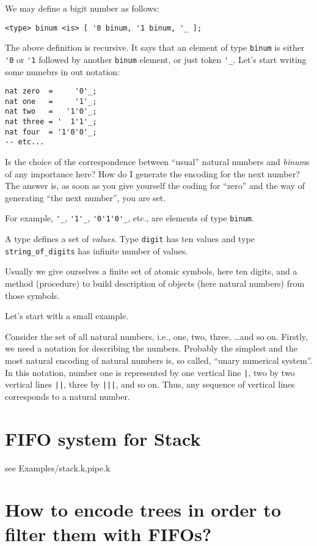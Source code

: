 \documentclass{book}
\begin{document}
We may define a bigit number as follows:
\begin{verbatim}
<type> binum <is> [ '0 binum, '1 binum, '_ ];
\end{verbatim}
The above definition is recursive. It says that an element of type
\verb+binum+ is either \verb+'0+ or \verb+'1+ followed by another
\verb+binum+ element, or just token \verb+'_+. Let's start writing
some numebrs in out notation:
\begin{verbatim}
nat zero  =     '0'_;
nat one   =     '1'_;
nat two   =   '1'0'_;
nat three = '  1'1'_;
nat four  = '1'0'0'_; 
-- etc...
\end{verbatim}
Is the choice of the correspondence between ``usual'' natural numbers
and \emph{binum}s of any importance here? How do I generate the
encoding for the next number? The answer is, as soon as you give
yourself the coding for ``zero'' and the way of generating ``the next
number'', you are set. 

For example, \verb+'_+,
\verb+'1'_+, \verb+'0'1'0'_+, etc., are elements of type \verb+binum+.



A type defines a set of \emph{values}. Type \verb+digit+ has ten values and 
type \verb+string_of_digits+ has infinite number of values.  



Usually we give ourselves a finite set of atomic symbols, here ten
digits, and a method (procedure) to build description of objects (here
natural numbers) from those symbols.


Let's start with a small example. 


Consider the set of all natural
numbers, i.e., one, two, three, \ldots and so on. Firstly, we need a
notation for describing the numbers. Probably the simplest and the
most natural encoding of natural numbers is, so called, ``unary
numerical system''. In this notation, number one is represented by one
vertical line \verb+|+, two by two vertical lines \verb+||+, three by
\verb+|||+, and so on. Thus, any sequence of vertical lines
corresponds to a natural number.



\section{FIFO system for Stack}

see Examples/stack.k,pipe.k

\section{How to encode trees in order to filter them with FIFOs?}
\end{document}
